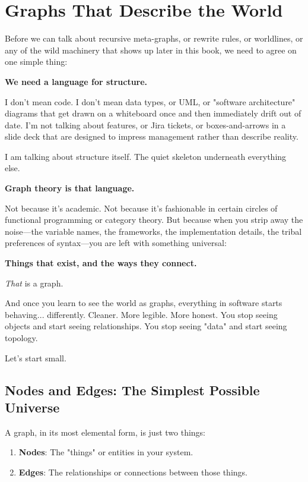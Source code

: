 \chapter{Graphs That Describe the World}
\label{chap:graphs-describe-the-world}

Before we can talk about recursive meta-graphs, or rewrite rules, or worldlines, or any of the wild machinery that shows up later in this book, we need to agree on one simple thing:

\textbf{We need a language for structure.}

I don't mean code. I don't mean data types, or UML, or "software architecture" diagrams that get drawn on a whiteboard once and then immediately drift out of date. I'm not talking about features, or Jira tickets, or boxes-and-arrows in a slide deck that are designed to impress management rather than describe reality.

I am talking about structure itself. The quiet skeleton underneath everything else.

\textbf{Graph theory is that language.}

Not because it's academic. Not because it's fashionable in certain circles of functional programming or category theory. But because when you strip away the noise—the variable names, the frameworks, the implementation details, the tribal preferences of syntax—you are left with something universal:

\textbf{Things that exist, and the ways they connect.}

\textit{That} is a graph.

And once you learn to see the world as graphs, everything in software starts behaving... differently. Cleaner. More legible. More honest. You stop seeing objects and start seeing relationships. You stop seeing "data" and start seeing topology.

Let's start small.

\section{Nodes and Edges: The Simplest Possible Universe}
\label{sec:nodes-and-edges}

A graph, in its most elemental form, is just two things:
\begin{enumerate}
    \item \textbf{Nodes}: The "things" or entities in your system.
    \item \textbf{Edges}: The relationships or connections between those things.
\end{enumerate}

